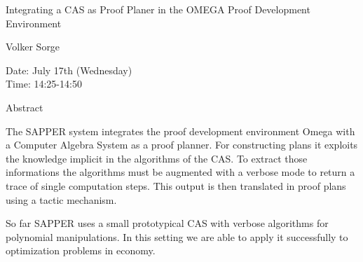 \begin{center}
\LARGE
Integrating a CAS as Proof Planer in the OMEGA Proof
                  Development Environment 
\end{center}

\begin{center}
\Large
Volker Sorge
\end{center}

\noindent
Date:  July 17th (Wednesday)\\
Time:  14:25-14:50\\

\begin{center}
\large
Abstract
\end{center}

The SAPPER system integrates the proof development environment Omega with a
Computer Algebra System as a proof planner. For constructing plans it
exploits the knowledge implicit in the algorithms of the CAS. To extract
those informations the algorithms must be augmented with a verbose mode to
return a trace of single computation steps. This output is then translated
in proof plans using a tactic mechanism.

So far SAPPER uses a small prototypical CAS with verbose algorithms for
polynomial manipulations. In this setting we are able to apply it
successfully to optimization problems in economy.






